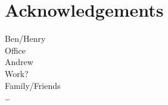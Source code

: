 
\chapter*{Acknowledgements}
\label{cha:ack}

Ben/Henry\\

Office\\

Andrew\\

Work?\\

Family/Friends\\

\dots


